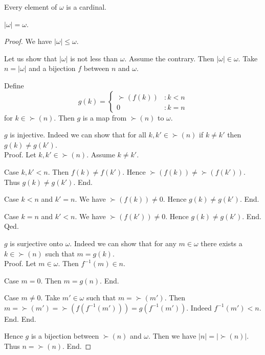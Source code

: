 \documentclass[10pt]{article}
\begin{document}
  \begin{forthel}
    \begin{corollary}
      Every element of $\omega$ is a cardinal.
    \end{corollary}
  \end{forthel}

  \begin{forthel}
    \begin{proposition}
      $|\omega| = \omega$.
    \end{proposition}
    \begin{proof}
      We have $|\omega| \leq \omega$.

      Let us show that $|\omega|$ is not less than $\omega$.
        Assume the contrary.
        Then $|\omega| \in \omega$.
        Take $n = |\omega|$ and a bijection $f$ between $n$ and $\omega$.

        Define \[ g(k) =
          \begin{cases}
            \succ(f(k)) & : k < n
            \\
            0           & : k = n
          \end{cases} \]
        for $k \in \succ(n)$.
        Then $g$ is a map from $\succ(n)$ to $\omega$.

        $g$ is injective.
        Indeed we can show that for all $k, k' \in \succ(n)$ if $k \neq k'$
        then $g(k) \neq g(k')$. \\
        Proof.
          Let $k, k' \in \succ(n)$.
          Assume $k \neq k'$.

          Case $k, k' < n$.
            Then $f(k) \neq f(k')$.
            Hence $\succ(f(k)) \neq \succ(f(k'))$.
            Thus $g(k) \neq g(k')$.
          End.

          Case $k < n$ and $k' = n$.
            We have $\succ(f(k)) \neq 0$.
            Hence $g(k) \neq g(k')$.
          End.

          Case $k = n$ and $k' < n$.
            We have $\succ(f(k')) \neq 0$.
            Hence $g(k) \neq g(k')$.
          End.
        Qed.

        $g$ is surjective onto $\omega$.
        Indeed we can show that for any $m \in \omega$ there exists a
        $k \in \succ(n)$ such that $m = g(k)$. \\
        Proof.
          Let $m \in \omega$.
          Then $f^{-1}(m) \in n$.

          Case $m = 0$.
            Then $m = g(n)$.
          End.

          Case $m \neq 0$.
            Take $m' \in \omega$ such that $m = \succ(m')$.
            Then $m
              = \succ(m')
              = \succ(f(f^{-1}(m')))
              = g(f^{-1}(m'))$.
            Indeed $f^{-1}(m') < n$.
          End.
        End.

        Hence $g$ is a bijection between $\succ(n)$ and $\omega$.
        Then we have $|n| = |\succ(n)|$.
        Thus $n = \succ(n)$.
      End.
    \end{proof}
  \end{forthel}
\end{document}
